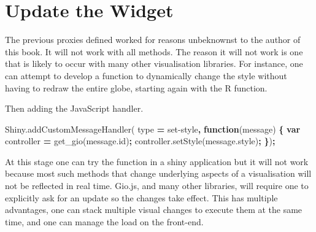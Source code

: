 \documentclass[
]{krantz}
\makeatletter
\newenvironment{Shaded}{\begin{snugshade}}{\end{snugshade}}
\newcommand{\AttributeTok}[1]{\textcolor[rgb]{0.61,0.61,0.61}{#1}}
\newcommand{\CommentTok}[1]{\textcolor[rgb]{0.37,0.37,0.37}{\textit{#1}}}
\newcommand{\ControlFlowTok}[1]{\textcolor[rgb]{0.27,0.27,0.27}{\textbf{#1}}}
\newcommand{\DataTypeTok}[1]{\textcolor[rgb]{0.27,0.27,0.27}{#1}}
\newcommand{\KeywordTok}[1]{\textcolor[rgb]{0.27,0.27,0.27}{\textbf{#1}}}
\newcommand{\NormalTok}[1]{#1}
\newcommand{\OperatorTok}[1]{\textcolor[rgb]{0.43,0.43,0.43}{\textbf{#1}}}
\newcommand{\StringTok}[1]{\textcolor[rgb]{0.5,0.5,0.5}{#1}}
\newcommand{\VariableTok}[1]{\textcolor[rgb]{0,0,0}{#1}}
\newenvironment{kframe}{%
\medskip{}
\setlength{\fboxsep}{.8em}
 \def\at@end@of@kframe{}%
 \ifinner\ifhmode%
  \def\at@end@of@kframe{\end{minipage}}%
  \begin{minipage}{\columnwidth}%
 \fi\fi%
 \def\FrameCommand##1{\hskip\@totalleftmargin \hskip-\fboxsep
 \colorbox{shadecolor}{##1}\hskip-\fboxsep
     \hskip-\linewidth \hskip-\@totalleftmargin \hskip\columnwidth}%
 \MakeFramed {\advance\hsize-\width
   \@totalleftmargin\z@ \linewidth\hsize
   \@setminipage}}%
 {\par\unskip\endMakeFramed%
 \at@end@of@kframe}
\renewenvironment{Shaded}{\begin{kframe}}{\end{kframe}}
\makeatother
\begin{document}
\hypertarget{shiny-widgets-update}{%
\section{Update the Widget}\label{shiny-widgets-update}}

The previous proxies defined worked for reasons unbeknownst to the author of this book. It will not work with all methods. The reason it will not work is one that is likely to occur with many other visualisation libraries. For instance, one can attempt to develop a function to dynamically change the style without having to redraw the entire globe, starting again with the R function.

\begin{Shaded}
\end{Shaded}

Then adding the JavaScript handler.

\begin{Shaded}
\begin{Highlighting}[]
\VariableTok{Shiny}\NormalTok{.}\AttributeTok{addCustomMessageHandler}\NormalTok{(}
\NormalTok{  type }\OperatorTok{=} \StringTok{\textquotesingle{}set{-}style\textquotesingle{}}\OperatorTok{,} \KeywordTok{function}\NormalTok{(message) }\OperatorTok{\{}
    \KeywordTok{var}\NormalTok{ controller }\OperatorTok{=} \AttributeTok{get\_gio}\NormalTok{(}\VariableTok{message}\NormalTok{.}\AttributeTok{id}\NormalTok{)}\OperatorTok{;}
    \VariableTok{controller}\NormalTok{.}\AttributeTok{setStyle}\NormalTok{(}\VariableTok{message}\NormalTok{.}\AttributeTok{style}\NormalTok{)}\OperatorTok{;}
\OperatorTok{\}}\NormalTok{)}\OperatorTok{;}
\end{Highlighting}
\end{Shaded}

At this stage one can try the function in a shiny application but it will not work because most such methods that change underlying aspects of a visualisation will not be reflected in real time. Gio.js, and many other libraries, will require one to explicitly ask for an update so the changes take effect. This has multiple advantages, one can stack multiple visual changes to execute them at the same time, and one can manage the load on the front-end.
\end{document}
